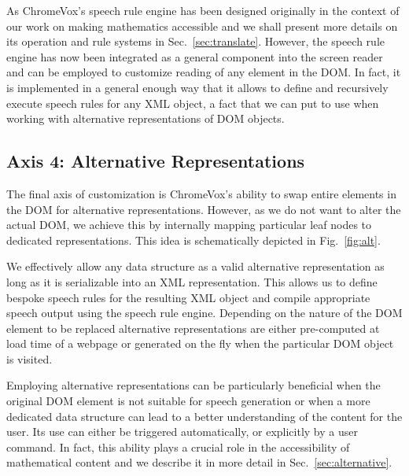 \documentclass{sig-alternate}
\begin{document}
As ChromeVox's speech rule engine has been designed originally in the context of
our work on making mathematics accessible and we shall present more details on
its operation and rule systems in Sec.~\ref{sec:translate}. However, the speech
rule engine has now been integrated as a general component into the screen
reader and can be employed to customize reading of any element in the DOM. In
fact, it is implemented in a general enough way that it allows to define and
recursively execute speech rules for any XML object, a fact that we can put to
use when working with alternative representations of DOM objects.


\subsection{Axis 4: Alternative Representations}
\label{sec:ax4}


The final axis of customization is ChromeVox's ability to swap entire elements
in the DOM for alternative representations. However, as we do not want to alter
the actual DOM, we achieve this by internally mapping particular leaf nodes to
dedicated representations. This idea is schematically depicted in
Fig.~\ref{fig:alt}.


We effectively allow any data structure as a valid alternative representation as
long as it is serializable into an XML representation. This allows us to define
bespoke speech rules for the resulting XML object and compile appropriate
speech output using the speech rule engine. Depending on the nature of the DOM
element to be replaced alternative representations are either pre-computed at
load time of a webpage or generated on the fly when the particular DOM object is
visited.

Employing alternative representations can be particularly beneficial when the
original DOM element is not suitable for speech generation or when a more
dedicated data structure can lead to a better understanding of the content
for the user. Its use can either be triggered automatically, or explicitly by a
user command. In fact, this ability plays a crucial role in the accessibility of
mathematical content and we describe it in more detail in
Sec.~\ref{sec:alternative}.
\end{document}
